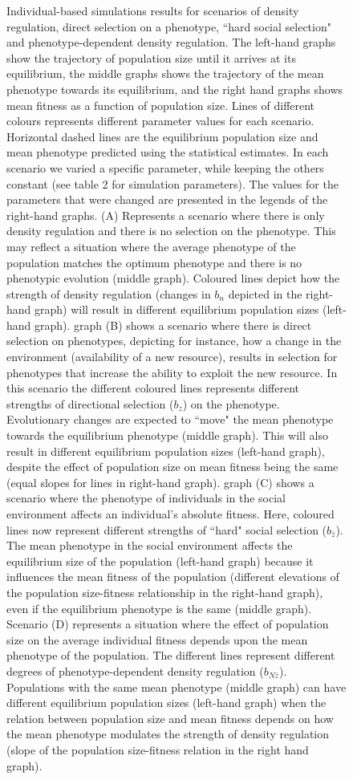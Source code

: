 \documentclass{article}
\begin{document}
\begin{figure}[ht]
	\caption{Individual-based simulations results for scenarios of density regulation, direct selection on a phenotype, ``hard social selection" and phenotype-dependent density regulation. The left-hand graphs show the trajectory of population size until it arrives at its equilibrium, the middle graphs shows the trajectory of the mean phenotype towards its equilibrium, and the right hand graphs shows mean fitness as a function of population size. Lines of different colours represents different parameter values for each scenario. Horizontal dashed lines are the equilibrium population size and mean phenotype predicted using the statistical estimates. In each scenario we varied a specific parameter, while keeping the others constant (see table 2 for simulation parameters). The values for the parameters that were changed are presented in the legends of the right-hand graphs. (A) Represents a scenario where there is only density regulation and there is no selection on the phenotype. This may reflect a situation where the average phenotype of the population matches the optimum phenotype and there is no phenotypic evolution (middle graph). Coloured lines depict how the strength of density regulation (changes in $b_n$ depicted in the right-hand graph) will result in different equilibrium population sizes (left-hand graph). graph (B) shows a scenario where there is direct selection on phenotypes, depicting for instance, how a change in the environment (availability of a new resource), results in selection for phenotypes that increase the ability to exploit the new resource. In this scenario the different coloured lines represents different strengths of directional selection ($b_z$) on the phenotype. Evolutionary changes are expected to ``move" the mean phenotype towards the equilibrium phenotype (middle graph). This will also result in different equilibrium population sizes (left-hand graph), despite the effect of population size on mean fitness being the same (equal slopes for lines in right-hand graph). graph (C) shows a scenario where the phenotype of individuals in the social environment affects an individual's absolute fitness. Here, coloured lines now represent different strengths of ``hard" social selection ($b_{\bar{z}}$).  The mean phenotype in the social environment affects the equilibrium size of the population (left-hand graph) because it influences the mean fitness of the population (different elevations of the population size-fitness relationship in the right-hand graph), even if the equilibrium phenotype is the same (middle graph). Scenario (D) represents a situation where the effect of population size on the average individual fitness depends upon the mean phenotype of the population. The different lines represent different degrees of phenotype-dependent density regulation ($b_{N\bar{z}}$). Populations with the same mean phenotype (middle graph) can have different equilibrium population sizes (left-hand graph) when the relation between population size and mean fitness depends on how the mean phenotype modulates the strength of density regulation (slope of the population size-fitness relation in the right hand graph).}
	\label{fig:sim2}
\end{figure}
\end{document}
